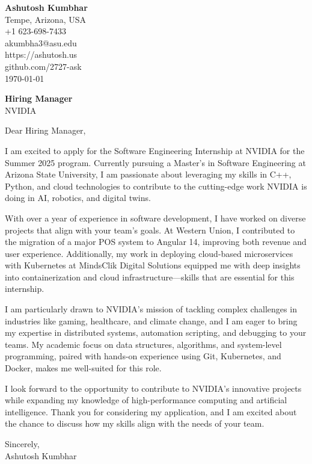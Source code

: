 \documentclass[11pt]{article}
\begin{document}
\begin{flushleft}
\textbf{Ashutosh Kumbhar} \\
Tempe, Arizona, USA \\
+1 623-698-7433 \\
akumbha3@asu.edu \\
https://ashutosh.us \\
github.com/2727-ask \\
\today
\end{flushleft}
\vspace{0.5em}
\textbf{Hiring Manager} \\
NVIDIA \\
\vspace{1em}

Dear Hiring Manager,

I am excited to apply for the Software Engineering Internship at NVIDIA for the Summer 2025 program. Currently pursuing a Master’s in Software Engineering at Arizona State University, I am passionate about leveraging my skills in C++, Python, and cloud technologies to contribute to the cutting-edge work NVIDIA is doing in AI, robotics, and digital twins.

With over a year of experience in software development, I have worked on diverse projects that align with your team's goals. At Western Union, I contributed to the migration of a major POS system to Angular 14, improving both revenue and user experience. Additionally, my work in deploying cloud-based microservices with Kubernetes at MindsClik Digital Solutions equipped me with deep insights into containerization and cloud infrastructure—skills that are essential for this internship. 

I am particularly drawn to NVIDIA’s mission of tackling complex challenges in industries like gaming, healthcare, and climate change, and I am eager to bring my expertise in distributed systems, automation scripting, and debugging to your teams. My academic focus on data structures, algorithms, and system-level programming, paired with hands-on experience using Git, Kubernetes, and Docker, makes me well-suited for this role.

I look forward to the opportunity to contribute to NVIDIA’s innovative projects while expanding my knowledge of high-performance computing and artificial intelligence. Thank you for considering my application, and I am excited about the chance to discuss how my skills align with the needs of your team.

Sincerely, \\
Ashutosh Kumbhar
\end{document}
